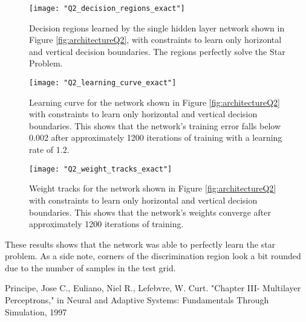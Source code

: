 \documentclass{article}[12 pt]
\begin{document}
\begin{center}
	\begin{figure}[H]
		\centering
		\texttt{[image: "Q2\_decision\_regions\_exact"]}
		\caption{Decision regions learned by the single hidden layer network shown in Figure \ref{fig:architectureQ2}, with constraints to learn only horizontal and vertical decision boundaries.  The regions perfectly solve the Star Problem. }
		\label{fig:Q2RegionsInexact}
	\end{figure}
\end{center}

\begin{center}
	\begin{figure}[H]
		\centering
		\texttt{[image: "Q2\_learning\_curve\_exact"]}
		\caption{Learning curve for the network shown in Figure \ref{fig:architectureQ2} with constraints to learn only horizontal and vertical decision boundaries.  This shows that the network's training error falls below 0.002 after approximately 1200 iterations of training with a learning rate of 1.2.}
		\label{fig:Q2RegionsInexact}
	\end{figure}
\end{center}

\begin{center}
	\begin{figure}[H]
		\centering
		\texttt{[image: "Q2\_weight\_tracks\_exact"]}
		\caption{Weight tracks for the network shown in Figure \ref{fig:architectureQ2} with constraints to learn only horizontal and vertical decision boundaries.  This shows that the network's weights converge after approximately 1200 iterations of training.}
		\label{fig:Q2RegionsInexact}
	\end{figure}
\end{center}

\noindent
These results shows that the network was able to perfectly learn the star problem.  As a side note, corners of the discrimination region look a bit rounded due to the number of samples in the test grid.   

\begin{thebibliography}{00}
	Principe, Jose C., Euliano, Niel R., Lefebvre, W. Curt. "Chapter III- Multilayer Perceptrons," in Neural and Adaptive Systems: Fundamentals Through Simulation, 1997
\end{thebibliography}
\end{document}
